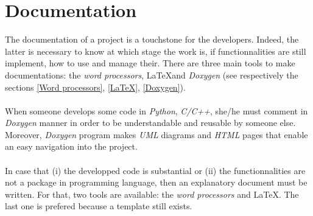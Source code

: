 \documentclass[a4paper, 12pt, oneside]{report}
\title{\titleVariable}
\author{\authorVariable}
\date{\centering First release: \firstRelease \\ Last modification: \today}
\begin{document}
\maketitle

\begin{abstract}
This documentation is devided in two chapter. The first one (chapter \ref{Documentation}) is devoted in the manner to create a good documentation. Indeed, the documentation of a project is a touchstone for the developers. Indeed, the latter is necessary to know at which stage the work is, if functionnalities are still implement, how to use and manage their. There are three main tools to make documentations: the \textit{word processors}, \LaTeX and \textit{Doxygen} (see respectively the sections \ref{Word processors}, \ref{LaTeX}, \ref{Doxygen}).\\
\\
In the second chapter (chapter \ref{Standard coding}) we detail the way to code in well format. Actually, respecting a strict standard of coding (indentation, syntax of variables, classes etc.) allows to a programmer to read some code that she/he have not developed. This feeling of \textit{déjà-vu} facilitate the modification, the maintenance and the management of it.
\end{abstract}


\tableofcontents

\chapter{Documentation \label{Documentation}}
The documentation of a project is a touchstone for the developers. Indeed, the latter is necessary to know at which stage the work is, if functionnalities are still implement, how to use and manage their. There are three main tools to make documentations: the \textit{word processors}, \LaTeX and \textit{Doxygen} (see respectively the sections \ref{Word processors}, \ref{LaTeX}, \ref{Doxygen}).\\
\\
When someone develops some code in \textit{Python}, \textit{C/C++}, she/he must comment in \textit{Doxygen} manner in order to be understandable and reusable by someone else. Moreover, \textit{Doxygen} program makes \textit{UML} diagrams and \textit{HTML} pages that enable an easy navigation into the project.\\
\\
In case that (i) the developped code is substantial or (ii) the functionnalities are not a package in programming language, then an explanatory document must be written. For that, two tools are available: the \textit{word processors} and \LaTeX. The last one is prefered because a template still exists.
\end{document}
